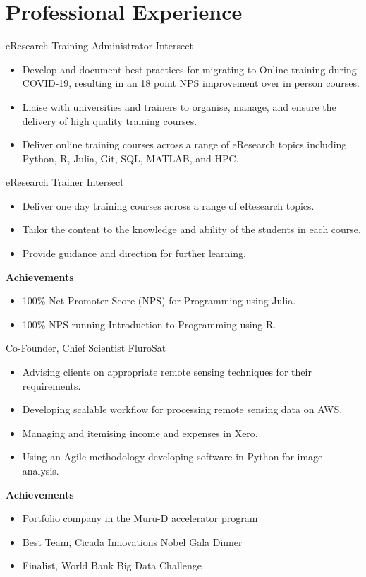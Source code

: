 \section{Professional Experience}

{eResearch Training Administrator}
{Intersect}{}{}
{%
  \begin{itemize}
    \item Develop and document best practices for migrating to Online training during
      COVID-19, resulting in an 18 point NPS improvement over in person courses.
    \item Liaise with universities and trainers to organise, manage, and ensure
      the delivery of high quality training courses.
    \item Deliver online training courses across a range of eResearch topics
      including Python, R, Julia, Git, SQL, MATLAB, and HPC.
  \end{itemize}
}

{eResearch Trainer}
{Intersect}{}{}
{%
  \begin{itemize}
    \item Deliver one day training courses across a range of eResearch topics.
    \item Tailor the content to the knowledge and ability of the students in each
      course.
    \item Provide guidance and direction for further learning.
  \end{itemize}
  \textbf{Achievements}
  \begin{itemize}
    \item 100\% Net Promoter Score (NPS) for Programming using Julia.
    \item 100\% NPS running Introduction to Programming using R.
  \end{itemize}
}

{Co-Founder, Chief Scientist}
{FluroSat}{}{}
{%
  \begin{itemize}
    \item Advising clients on appropriate remote sensing techniques for their
      requirements.
    \item Developing scalable workflow for processing remote sensing data on AWS.
    \item Managing and itemising income and expenses in Xero.
    \item Using an Agile methodology developing software in Python
      for image analysis.
  \end{itemize}
  \textbf{Achievements}
  \begin{itemize}
    \item Portfolio company in the Muru-D accelerator program
    \item Best Team, Cicada Innovations Nobel Gala Dinner
    \item Finalist, World Bank Big Data Challenge
  \end{itemize}
}

